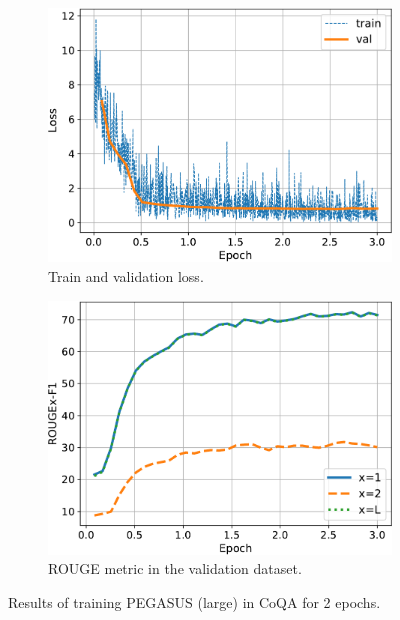 \documentclass[a4paper, 10pt]{article}
\begin{document}
    \begin{figure}[!htb]
    	\centering
    	\begin{subfigure}[b]{0.49\textwidth}
    		\centering
    		\includegraphics[width=\textwidth]{Figures/loss.pdf}
    		\caption{Train and validation loss.}
    	\end{subfigure}
    	\hfill
    	\begin{subfigure}[b]{0.49\textwidth}
    		\centering
    		\includegraphics[width=\textwidth]{Figures/rouge.pdf}
    		\caption{ROUGE metric in the validation dataset.}
    	\end{subfigure}
    	\caption{Results of training PEGASUS (large) in CoQA for 2 epochs.}
		\label{fig:results}
    \end{figure}
\end{document}
